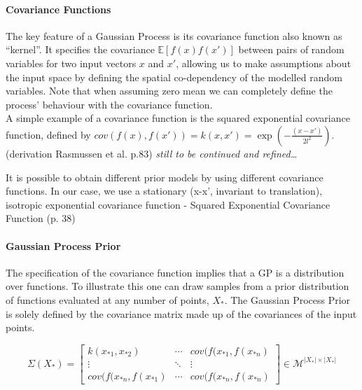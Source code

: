 \paragraph{Covariance Functions}
The key feature of a Gaussian Process is its covariance function also known as ``kernel''. It specifies the covariance $\mathbb{E}[f(x)f(x')]$ between pairs of random variables for two input vectors $x$ and $x'$, allowing us to make assumptions about the input space by defining the spatial co-dependency of the modelled random variables. Note that when assuming zero mean we can completely define the process' behaviour with the covariance function.\\
A simple example of a covariance function is the squared exponential covariance function, defined by $cov(f(x),f(x'))=k(x,x')=\exp(-\frac{(x-x')}{2l^{2}})$. (derivation Rasmussen et al. p.83) \textit{still to be continued and refined\ldots}  

It is possible to obtain different prior models by using different covariance functions. In our case, we use a stationary (x-x’, invariant to translation), isotropic exponential covariance function - Squared Exponential Covariance Function (p. 38)

\paragraph{Gaussian Process Prior}
The specification of the covariance function implies that a GP is a distribution over functions. To illustrate this one can draw samples from a prior distribution of functions evaluated at any number of points, $X_{*}$. The Gaussian Process Prior is solely defined by the covariance matrix made up of the covariances of the input points.

\begin{equation}
    \Sigma(X_{*})=\begin{bmatrix}
k(x_{*1},x_{*2}) & \cdots & cov(f(x_{*1},f(x_{*n}) \\
\vdots & \ddots & \vdots \\
cov(f(x_{*n},f(x_{*1}) & \cdots & cov(f(x_{*n},f(x_{*n}) 
\end{bmatrix} \in \mathcal{M}^{\left|X_{*}\right| \times \left|X_{*}\right|} 
\end{equation}

